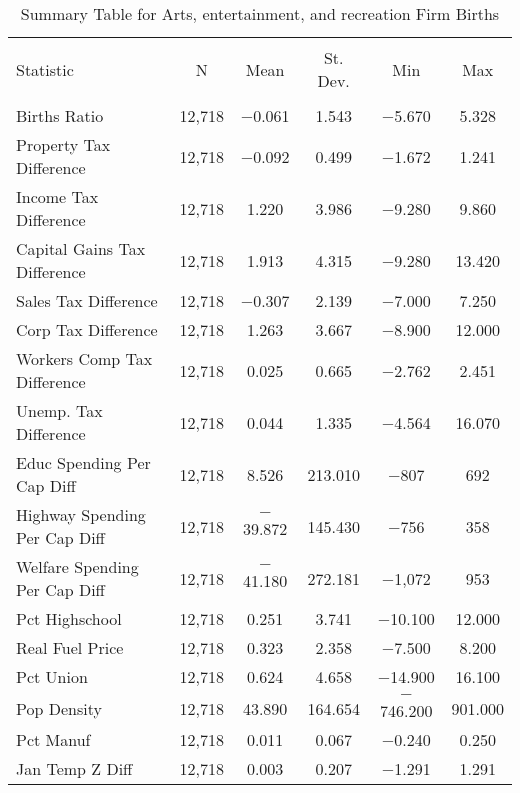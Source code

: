 
\begin{table}[!htbp] \centering 
  \caption{Summary Table for  Arts, entertainment, and recreation Firm Births} 
  \label{71summary} 
\begin{tabular}{@{\extracolsep{5pt}}lccccc} 
\\[-1.8ex]\hline 
\hline \\[-1.8ex] 
Statistic & \multicolumn{1}{c}{N} & \multicolumn{1}{c}{Mean} & \multicolumn{1}{c}{St. Dev.} & \multicolumn{1}{c}{Min} & \multicolumn{1}{c}{Max} \\ 
\hline \\[-1.8ex] 
Births Ratio & 12,718 & $-$0.061 & 1.543 & $-$5.670 & 5.328 \\ 
Property Tax Difference & 12,718 & $-$0.092 & 0.499 & $-$1.672 & 1.241 \\ 
Income Tax Difference & 12,718 & 1.220 & 3.986 & $-$9.280 & 9.860 \\ 
Capital Gains Tax Difference & 12,718 & 1.913 & 4.315 & $-$9.280 & 13.420 \\ 
Sales Tax Difference & 12,718 & $-$0.307 & 2.139 & $-$7.000 & 7.250 \\ 
Corp Tax Difference & 12,718 & 1.263 & 3.667 & $-$8.900 & 12.000 \\ 
Workers Comp Tax Difference & 12,718 & 0.025 & 0.665 & $-$2.762 & 2.451 \\ 
Unemp. Tax Difference & 12,718 & 0.044 & 1.335 & $-$4.564 & 16.070 \\ 
Educ Spending Per Cap Diff & 12,718 & 8.526 & 213.010 & $-$807 & 692 \\ 
Highway Spending Per Cap Diff & 12,718 & $-$39.872 & 145.430 & $-$756 & 358 \\ 
Welfare Spending Per Cap Diff & 12,718 & $-$41.180 & 272.181 & $-$1,072 & 953 \\ 
Pct Highschool & 12,718 & 0.251 & 3.741 & $-$10.100 & 12.000 \\ 
Real Fuel Price & 12,718 & 0.323 & 2.358 & $-$7.500 & 8.200 \\ 
Pct Union & 12,718 & 0.624 & 4.658 & $-$14.900 & 16.100 \\ 
Pop Density & 12,718 & 43.890 & 164.654 & $-$746.200 & 901.000 \\ 
Pct Manuf & 12,718 & 0.011 & 0.067 & $-$0.240 & 0.250 \\ 
Jan Temp Z Diff & 12,718 & 0.003 & 0.207 & $-$1.291 & 1.291 \\ 

\end{tabular}
\end{table}
